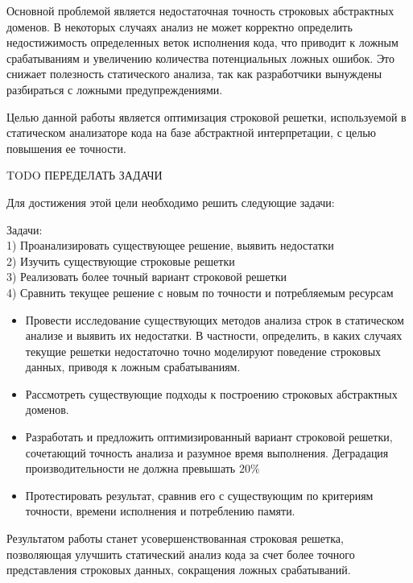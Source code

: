 Основной проблемой является недостаточная точность строковых абстрактных доменов. В некоторых случаях анализ не может корректно определить недостижимость определенных веток исполнения кода, что приводит к ложным срабатываниям и увеличению количества потенциальных ложных ошибок. Это снижает полезность статического анализа, так как разработчики вынуждены разбираться с ложными предупреждениями.

Целью данной работы является оптимизация строковой решетки, используемой в статическом анализаторе кода на базе абстрактной интерпретации, с целью повышения ее точности.

TODO ПЕРЕДЕЛАТЬ ЗАДАЧИ

Для достижения этой цели необходимо решить следующие задачи:

Задачи:\\
1) Проанализировать существующее решение, выявить недостатки\\
2) Изучить существующие строковые решетки\\
3) Реализовать более точный вариант строковой решетки\\
4) Сравнить текущее решение с новым по точности и потребляемым ресурсам


\begin{itemize}
\item Провести исследование существующих методов анализа строк в статическом анализе и выявить их недостатки. В частности, определить, в каких случаях текущие решетки недостаточно точно моделируют поведение строковых данных, приводя к ложным срабатываниям.

\item Рассмотреть существующие подходы к построению строковых абстрактных доменов.

\item Разработать и предложить оптимизированный вариант строковой решетки, сочетающий точность анализа и разумное время выполнения. Деградация производительности не должна превышать $20\%$

\item Протестировать результат, сравнив его с существующим по критериям точности, времени исполнения и потреблению памяти.
\end{itemize}

Результатом работы станет усовершенствованная строковая решетка, позволяющая улучшить статический анализ кода за счет более точного представления строковых данных, сокращения ложных срабатываний.

\newpage
